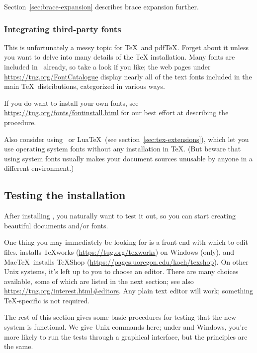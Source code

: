\documentclass{article}
\begin{document}
Section~\ref{sec:brace-expansion} describes brace expansion further.


\subsubsection{Integrating third-party fonts}

This is unfortunately a messy topic for \TeX\ and pdf\TeX. Forget about
it unless you want to delve into many details of the \TeX{}
installation. Many fonts are included in \TL\ already, so take a look if
you like; the web pages under \url{https://tug.org/FontCatalogue}
display nearly all of the text fonts included in the main \TeX\
distributions, categorized in various ways.

If you do want to install your own fonts, see
\url{https://tug.org/fonts/fontinstall.html} for our best effort at
describing the procedure.

Also consider using \XeTeX\ or Lua\TeX\ (see
section~\ref{sec:tex-extensions}), which let you use operating
system fonts without any installation in \TeX. (But beware that using
system fonts usually makes your document sources unusable by anyone in a
different environment.)

\subsection{Testing the installation}
\label{sec:test-install}

After installing \TL{}, you naturally want to test it out, so you can
start creating beautiful documents and\slash or fonts.

One thing you may immediately be looking for is a front-end with which
to edit files.  \TL{} installs \TeX{}works
(\url{https://tug.org/texworks}) on Windows (only), and Mac\TeX\ installs
TeXShop (\url{https://pages.uoregon.edu/koch/texshop}).  On other Unix
systems, it's left up to you to choose an editor.  There are many
choices available, some of which are listed in the next section; see
also \url{https://tug.org/interest.html#editors}.  Any plain text editor
will work; something \TeX-specific is not required.

The rest of this section gives some basic procedures for testing that
the new system is functional.  We give Unix commands here; under
\MacOSX{} and Windows, you're more likely to run the tests through a
graphical interface, but the principles are the same.
\end{document}
